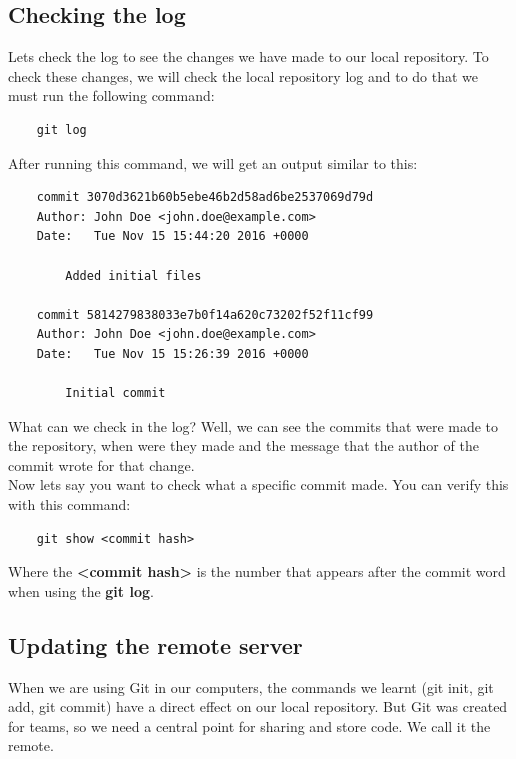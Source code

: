 \documentclass{article}
\begin{document}
\subsection{Checking the log}

Lets check the log to see the changes we have made to our local repository. To check these changes, we will check the local repository log and to do that we must run the following command:

\begin{lstlisting}
	git log
\end{lstlisting}

After running this command, we will get an output similar to this:

\begin{lstlisting}
	commit 3070d3621b60b5ebe46b2d58ad6be2537069d79d
	Author: John Doe <john.doe@example.com>
	Date:   Tue Nov 15 15:44:20 2016 +0000

    	Added initial files

	commit 5814279838033e7b0f14a620c73202f52f11cf99
	Author: John Doe <john.doe@example.com>
	Date:   Tue Nov 15 15:26:39 2016 +0000

    	Initial commit
\end{lstlisting}

What can we check in the log? Well, we can see the commits that were made to the repository, when were they made and the message that the author of the commit wrote for that change.\\

Now lets say you want to check what a specific commit made. You can verify this with this command:

\begin{lstlisting}
	git show <commit hash>
\end{lstlisting}

Where the \textbf{\textless commit hash\textgreater} is the number that appears after the commit word when using the \textbf{git log}.\\

\subsection{Updating the remote server}

When we are using Git in our computers, the commands we learnt (git init, git add, git commit) have a direct effect on our local repository. But Git was created for teams, so we need a central point for sharing and store code. We call it the remote.\\
\end{document}
